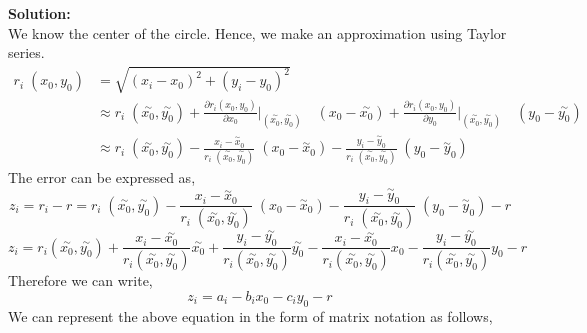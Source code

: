 \noindent \textbf{Solution:}\\
\noindent We know the center of the circle. Hence, we make an approximation using Taylor series.
\begin{equation*} 
\begin{split}
 r_i\;(x_0,y_0) &= \sqrt{(x_i - x_0)^2 + (y_i - y_0)^2} \\
 & \approx r_i\;(\overset{\sim}{x_0}, \overset{\sim}{y_0}) + \frac{\partial r_i (x_0,y_0)}{\partial x_0}\Bigg|_{ (\overset{\sim}{x_0}, \overset{\sim}{y_0} )} \quad ({x_0} - \overset{\sim}{x_0}) + \frac{\partial r_i (x_0,y_0)}{\partial y_0}\Bigg|_{ (\overset{\sim}{x_0}, \overset{\sim}{y_0} )} \quad ({y_0} - \overset{\sim}{y_0}) \\
  & \approx r_i\;(\overset{\sim}{x_0}, \overset{\sim}{y_0}) - \frac{x_i - \overset{\sim}{x}_0}{  r_i\;(\overset{\sim}{x_0}, \overset{\sim}{y_0})}\;(x_0 - \overset{\sim}{x}_0) - \frac{y_i - \overset{\sim}{y}_0}{ r_i\;(\overset{\sim}{x_0}, \overset{\sim}{y_0})}\;(y_0 - \overset{\sim}{y}_0) 
\end{split}
\end{equation*}
\noindent The error can be expressed as,
$$ z_i = r_i - r =r_i\;(\overset{\sim}{x_0}, \overset{\sim}{y_0}) - \frac{x_i - \overset{\sim}{x}_0}{  r_i\;(\overset{\sim}{x_0}, \overset{\sim}{y_0})}\;(x_0 - \overset{\sim}{x}_0) - \frac{y_i - \overset{\sim}{y}_0}{ r_i\;(\overset{\sim}{x_0}, \overset{\sim}{y_0})}\;(y_0 - \overset{\sim}{y}_0) - r $$
$$ z_i = r_i(\overset{\sim}{x_0},\overset{\sim}{y_0})+\frac{x_i-\overset{\sim}{x_0}}{r_i(\overset{\sim}{x_0},\overset{\sim}{y_0})}\overset{\sim}{x_0}+\frac{y_i-\overset{\sim}{y_0}}{r_i(\overset{\sim}{x_0},\overset{\sim}{y_0})}\overset{\sim}{y_0}-\frac{x_i-\overset{\sim}{x_0}}{r_i(\overset{\sim}{x_0},\overset{\sim}{y_0})}x_0-\frac{y_i-\overset{\sim}{y_0}}{r_i(\overset{\sim}{x_0},\overset{\sim}{y_0})}y_0-r$$
\noindent Therefore we can write,
$$z_i=a_i - b_ix_0 - c_iy_0 -r$$
\noindent We can represent the above equation in the form of matrix notation as follows,
